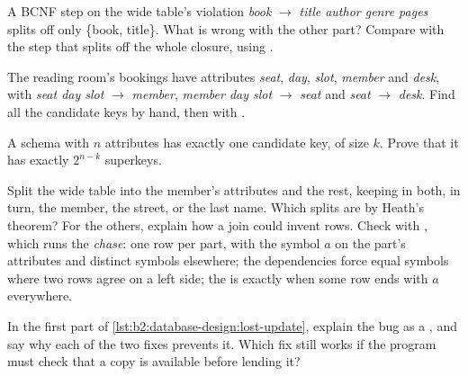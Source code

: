 \begin{exercise}[$\star$]\label{exo:b2:database-design:2}
A BCNF step on the wide table's violation \emph{book} $\to$ \emph{title author genre pages} splits off only
\{book, title\}. What is wrong with the other part? Compare with the step that splits off the whole closure, using
.
\end{exercise}

\begin{exercise}[$\star$]\label{exo:b2:database-design:3}
The reading room's bookings have attributes \emph{seat}, \emph{day}, \emph{slot}, \emph{member} and \emph{desk}, with
\emph{seat day slot} $\to$ \emph{member}, \emph{member day slot} $\to$ \emph{seat} and \emph{seat} $\to$ \emph{desk}. Find
all the candidate keys by hand, then with .
\end{exercise}

\begin{exercise}[$\star$]\label{exo:b2:database-design:4}
A schema with $n$ attributes has exactly one candidate key, of size $k$. Prove that it has exactly $2^{n-k}$ superkeys.
\end{exercise}

\begin{exercise}[$\star\star$]\label{exo:b2:database-design:5}
Split the wide table into the member's attributes and the rest, keeping in both, in turn, the member, the street, or the
last name. Which splits are  by Heath's theorem? For the others, explain how a join could invent rows. Check
with , which runs the \emph{chase}: one row per part, with the symbol $a$ on the part's attributes and
distinct symbols elsewhere; the dependencies force equal symbols where two rows agree on a left side; the
 is  exactly when some row ends with $a$ everywhere.
\end{exercise}

\begin{exercise}[$\star\star$]\label{exo:b2:database-design:6}
In the first part of \cref{lst:b2:database-design:lost-update}, explain the bug as a , and say why each of the
two fixes prevents it. Which fix still works if the program must check that a copy is available before lending it?
\end{exercise}

